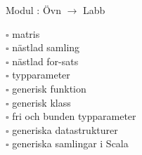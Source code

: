 
    Modul : Övn  $\rightarrow$ Labb 
    \begin{multicols}{3}\SlideFontTiny
    $\square$ matris \\
$\square$ nästlad samling \\
$\square$ nästlad for-sats \\
$\square$ typparameter \\
$\square$ generisk funktion \\
$\square$ generisk klass \\
$\square$ fri och bunden typparameter \\
$\square$ generiska datastrukturer \\
$\square$ generiska samlingar i Scala \\
    \end{multicols}
    